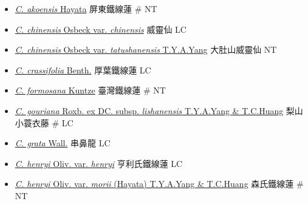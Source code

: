 \begin{itemize}
  \begin{itemize}
        \item[] \href{http://www.theplantlist.org/tpl1.1/search?q=Clematis+akoensis}{\textit{C. akoensis} Hayata}   屏東鐵線蓮  \# NT
        \item[] \href{http://www.theplantlist.org/tpl1.1/search?q=Clematis+chinensis+var.+chinensis}{\textit{C. chinensis} Osbeck var. \textit{chinensis}}   威靈仙   LC
        \item[] \href{http://www.theplantlist.org/tpl1.1/search?q=Clematis+chinensis+var.+tatushanensis}{\textit{C. chinensis} Osbeck var. \textit{tatushanensis} T.Y.A.Yang}   大肚山威靈仙   NT
        \item[] \href{http://www.theplantlist.org/tpl1.1/search?q=Clematis+crassifolia}{\textit{C. crassifolia} Benth.}   厚葉鐵線蓮   LC
        \item[] \href{http://www.theplantlist.org/tpl1.1/search?q=Clematis+formosana}{\textit{C. formosana} Kuntze}   臺灣鐵線蓮  \# NT
        \item[] \href{http://www.theplantlist.org/tpl1.1/search?q=Clematis+gouriana+subsp.+lishanensis}{\textit{C. gouriana} Roxb. ex DC. subsp. \textit{lishanensis} T.Y.A.Yang \& T.C.Huang}   梨山小蓑衣藤  \# LC
        \item[] \href{http://www.theplantlist.org/tpl1.1/search?q=Clematis+grata}{\textit{C. grata} Wall.}   串鼻龍   LC
        \item[] \href{http://www.theplantlist.org/tpl1.1/search?q=Clematis+henryi+var.+henryi}{\textit{C. henryi} Oliv. var. \textit{henryi}}   亨利氏鐵線蓮   LC
        \item[] \href{http://www.theplantlist.org/tpl1.1/search?q=Clematis+henryi+var.+morii}{\textit{C. henryi} Oliv. var. \textit{morii} (Hayata) T.Y.A.Yang \& T.C.Huang}   森氏鐵線蓮  \# NT

\end{itemize}
\end{itemize}
